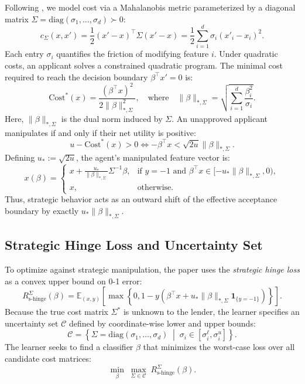 \documentclass[10pt, letterpaper]{article}
\newcommand{\E}{\mathbb{E}}
\newcommand{\C}{\mathcal{C}}
\newcommand{\diag}{\text{diag}}
\newcommand{\Rshinge}{R_{\text{s-hinge}}}
\begin{document}
Following \citet{rosenfeld2024oneshot}, we model cost via a Mahalanobis metric parameterized by a diagonal matrix $\Sigma = \diag(\sigma_1, \dots, \sigma_d) \succ 0$:
\begin{equation}
    c_\Sigma(x, x') = \frac{1}{2} (x' - x)^\top \Sigma (x' - x) = \frac{1}{2} \sum_{i=1}^d \sigma_i (x'_i - x_i)^2.
    \label{eq:cost}
\end{equation}
Each entry $\sigma_i$ quantifies the friction of modifying feature $i$. Under quadratic costs, an applicant solves a constrained quadratic program. The minimal cost required to reach the decision boundary $\beta^\top x' = 0$ is:
\begin{equation}
    \text{Cost}^*(x) = \frac{(\beta^\top x)^2}{2 \|\beta\|_{*,\Sigma}^2}, \quad \text{where} \quad \|\beta\|_{*,\Sigma} = \sqrt{\sum_{i=1}^d \frac{\beta_i^2}{\sigma_i}}.
\end{equation}
Here, $\|\beta\|_{*,\Sigma}$ is the dual norm induced by $\Sigma$. An unapproved applicant manipulates if and only if their net utility is positive:
\begin{equation}
    u - \text{Cost}^*(x) > 0 \iff -\beta^\top x < \sqrt{2u} \|\beta\|_{*,\Sigma}.
\end{equation}
Defining $u_* := \sqrt{2u}$, the agent's manipulated feature vector is:
\begin{equation}
    x(\beta) = \begin{cases}
        x + \frac{u_*}{\|\beta\|_{*,\Sigma}} \Sigma^{-1} \beta, & \text{if } y = -1 \text{ and } \beta^\top x \in [-u_* \|\beta\|_{*,\Sigma}, 0), \\
        x, & \text{otherwise}.
    \end{cases}
    \label{eq:movement}
\end{equation}
Thus, strategic behavior acts as an outward shift of the effective acceptance boundary by exactly $u_* \|\beta\|_{*,\Sigma}$.

\subsection{Strategic Hinge Loss and Uncertainty Set}
To optimize against strategic manipulation, the paper uses the \emph{strategic hinge loss} as a convex upper bound on 0-1 error:
\begin{equation}
    \Rshinge^\Sigma(\beta) = \E_{(x,y)} \left[ \max\left\{0, 1 - y\left(\beta^\top x + u_* \|\beta\|_{*,\Sigma} \mathbf{1}_{\{y = -1\}}\right)\right\} \right].
    \label{eq:hinge}
\end{equation}
Because the true cost matrix $\Sigma^*$ is unknown to the lender, the learner specifies an uncertainty set $\C$ defined by coordinate-wise lower and upper bounds:
\begin{equation}
    \C = \left\{ \Sigma = \diag(\sigma_1, \dots, \sigma_d) \;\middle|\; \sigma_i \in [\sigma_i^\ell, \sigma_i^u] \right\}.
\end{equation}
The learner seeks to find a classifier $\beta$ that minimizes the worst-case loss over all candidate cost matrices:
\begin{equation}
    \min_\beta \; \max_{\Sigma \in \C} \; \Rshinge^\Sigma(\beta).
    \label{eq:minimax}
\end{equation}
\end{document}
